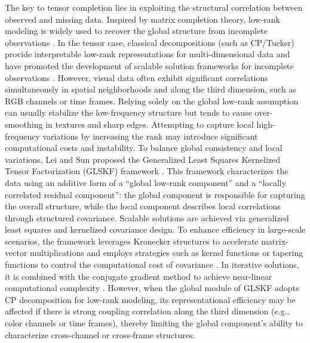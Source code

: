\documentclass[a4paper,12pt]{article}
\numberwithin{equation}{section}
\numberwithin{algorithm}{section}
\theoremstyle{remark}
\theoremstyle{definition}
\begin{document}
The key to tensor completion lies in exploiting the structural correlation between observed and missing data. Inspired by matrix completion theory, low-rank modeling is widely used to recover the global structure from incomplete observations \cite{candes2009matrix}. In the tensor case, classical decompositions (such as CP/Tucker) provide interpretable low-rank representations for multi-dimensional data \cite{kolda2009tensor} and have promoted the development of scalable solution frameworks for incomplete observations \cite{acar2011scalable}. However, visual data often exhibit significant correlations simultaneously in spatial neighborhoods and along the third dimension, such as RGB channels or time frames. Relying solely on the global low-rank assumption can usually stabilize the low-frequency structure but tends to cause over-smoothing in textures and sharp edges. Attempting to capture local high-frequency variations by increasing the rank may introduce significant computational costs and instability.
To balance global consistency and local variations, Lei and Sun proposed the Generalized Least Squares Kernelized Tensor Factorization (GLSKF) framework \cite{lei2024glskf}. This framework characterizes the data using an additive form of a ``global low-rank component'' and a ``locally correlated residual component'': the global component is responsible for capturing the overall structure, while the local component describes local correlations through structured covariance. Scalable solutions are achieved via generalized least squares and kernelized covariance design. To enhance efficiency in large-scale scenarios, the framework leverages Kronecker structures to accelerate matrix-vector multiplications \cite{allen2014glsmd} and employs strategies such as kernel functions or tapering functions to control the computational cost of covariance \cite{gneiting2002compact, furrer2006tapering}. In iterative solutions, it is combined with the conjugate gradient method to achieve near-linear computational complexity \cite{hestenes1952cg}. However, when the global module of GLSKF adopts CP decomposition for low-rank modeling, its representational efficiency may be affected if there is strong coupling correlation along the third dimension (e.g., color channels or time frames), thereby limiting the global component's ability to characterize cross-channel or cross-frame structures.
\end{document}
